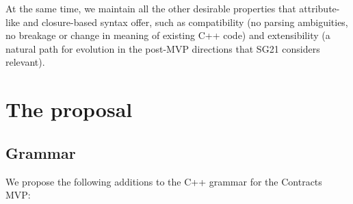  At the same time, we maintain all the other desirable properties that attribute-like and closure-based syntax offer, such as compatibility (no parsing ambiguities, no breakage or change in meaning of existing C++ code) and extensibility (a natural path for evolution in the post-MVP directions that SG21 considers relevant).
 

\section{The proposal}

\subsection{Grammar}

We propose the following additions to the C++ grammar for the Contracts MVP:


